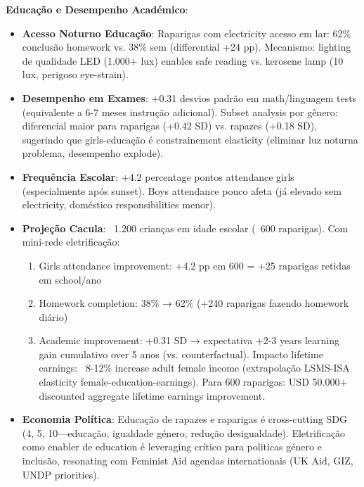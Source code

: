 \documentclass[12pt, a4paper]{article}
\begin{document}
\textbf{Educação e Desempenho Académico}:
\begin{itemize}
\item \textbf{Acesso Noturno Educação}: Raparigas com electricity acesso em lar: 62\% conclusão homework vs. 38\% sem (differential +24 pp). Mecanismo: lighting de qualidade LED (1.000+ lux) enables safe reading vs. kerosene lamp (10 lux, perigoso eye-strain).
\item \textbf{Desempenho em Exames}: +0.31 desvios padrão em math/linguagem tests (equivalente a 6-7 meses instrução adicional). Subset analysis por gênero: diferencial maior para raparigas (+0.42 SD) vs. rapazes (+0.18 SD), sugerindo que girls-educação é constrainement elasticity (eliminar luz noturna problema, desempenho explode).
\item \textbf{Frequência Escolar}: +4.2 percentage pontos attendance girls (especialmente após sunset). Boys attendance pouco afeta (já elevado sem electricity, doméstico responsibilities menor).
\item \textbf{Projeção Cacula}: ~1.200 crianças em idade escolar (~600 raparigas). Com mini-rede eletrificação:
  \begin{enumerate}
  \item Girls attendance improvement: +4.2 pp em 600 = +25 raparigas retidas em school/ano
  \item Homework completion: 38\% → 62\% (+240 raparigas fazendo homework diário)
  \item Academic improvement: +0.31 SD → expectativa +2-3 years learning gain cumulativo over 5 anos (vs. counterfactual). Impacto lifetime earnings: ~8-12\% increase adult female income (extrapolação LSMS-ISA elasticity female-education-earnings). Para 600 raparigas: USD 50.000+ discounted aggregate lifetime earnings improvement.
  \end{enumerate}
\item \textbf{Economia Política}: Educação de rapazes e raparigas é cross-cutting SDG (4, 5, 10—educação, igualdade género, redução desigualdade). Eletrificação como enabler de education é leveraging crítico para politicas género e inclusão, resonating com Feminist Aid agendas internationais (UK Aid, GIZ, UNDP priorities).
\end{itemize}
\end{document}

